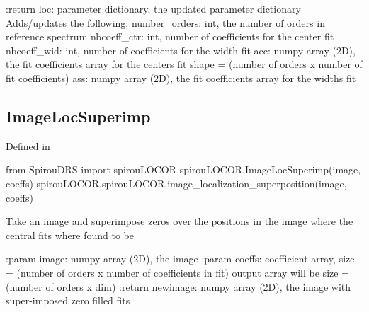 \begin{minipage}{\textwidth}
\begin{pythondocstring}
:return loc: parameter dictionary, the updated parameter dictionary
        Adds/updates the following:
            number_orders: int, the number of orders in reference spectrum
            nbcoeff_ctr: int, number of coefficients for the center fit
            nbcoeff_wid: int, number of coefficients for the width fit
            acc: numpy array (2D), the fit coefficients array for
                  the centers fit
                  shape = (number of orders x number of fit coefficients)
            ass: numpy array (2D), the fit coefficients array for
                  the widths fit
\end{pythondocstring}
\end{minipage}

\begin{minipage}{\textwidth}
\subsection{ImageLocSuperimp}

Defined in \spirouLOCOR{}

\begin{pythonbox}
from SpirouDRS import spirouLOCOR
spirouLOCOR.ImageLocSuperimp(image, coeffs)
spirouLOCOR.spirouLOCOR.image_localization_superposition(image, coeffs)
\end{pythonbox}

\begin{pythondocstring}
Take an image and superimpose zeros over the positions in the image where
the central fits where found to be

:param image: numpy array (2D), the image
:param coeffs: coefficient array,
               size = (number of orders x number of coefficients in fit)
               output array will be size = (number of orders x dim)
:return newimage: numpy array (2D), the image with super-imposed zero filled
                  fits
\end{pythondocstring}
\end{minipage}

